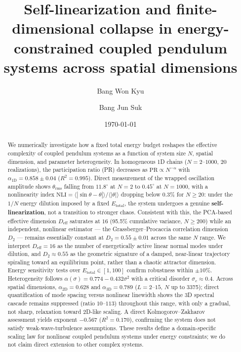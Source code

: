 \documentclass[aps,pre,12pt]{revtex4-2}
\begin{document}
\title{Self-linearization and finite-dimensional collapse in energy-constrained coupled pendulum systems across spatial dimensions}

\author{Bang Won Kyu}

\author{Bang Jun Suk}

\date{\today}

\begin{abstract}
We numerically investigate how a fixed total energy budget reshapes the effective complexity of coupled pendulum systems as a function of system size $N$, spatial dimension, and parameter heterogeneity. In homogeneous 1D chains ($N=2$--$1000$, 20 realizations), the participation ratio (PR) decreases as $\text{PR} \propto N^{-\alpha}$ with $\alpha_{1\text{D}} = 0.858 \pm 0.04$ ($R^2=0.995$). Direct measurement of the wrapped oscillation amplitude shows $\theta_{\text{rms}}$ falling from $11.8^\circ$ at $N=2$ to $0.45^\circ$ at $N=1000$, with a nonlinearity index $\text{NLI} = \langle|\sin\theta-\theta|\rangle/\langle|\theta|\rangle$ dropping below $0.3\%$ for $N \ge 20$: under the $1/N$ energy dilution imposed by a fixed $E_{\text{total}}$, the system undergoes a genuine \textbf{self-linearization}, not a transition to stronger chaos. Consistent with this, the PCA-based effective dimension $D_{\text{eff}}$ saturates at $16$ (95.5\% cumulative variance, $N\ge200$) while an independent, nonlinear estimator --- the Grassberger--Procaccia correlation dimension $D_2$ --- remains essentially constant at $D_2 = 0.55 \pm 0.01$ across the same $N$ range. We interpret $D_{\text{eff}}=16$ as the number of energetically active linear normal modes under dilution, and $D_2 \approx 0.55$ as the geometric signature of a damped, near-linear trajectory spiraling toward an equilibrium point, rather than a chaotic attractor dimension. Energy sensitivity tests over $E_{\text{total}}\in[1,100]$ confirm robustness within $\pm10\%$. Heterogeneity follows $\alpha(\sigma) = 0.774-0.432\sigma^2$ with a critical disorder $\sigma_c\approx0.4$. Across spatial dimensions, $\alpha_{2\text{D}}=0.628$ and $\alpha_{3\text{D}}=0.789$ ($L=2$--$15$, $N$ up to 3375); direct quantification of mode spacing versus nonlinear linewidth shows the 3D spectral cascade remains suppressed (ratio $10$--$113$) throughout this range, with only a gradual, not sharp, relaxation toward 2D-like scaling. A direct Kolmogorov--Zakharov assessment yields exponent $-0.567$ ($R^2=0.170$), confirming the system does not satisfy weak-wave-turbulence assumptions. These results define a domain-specific scaling law for nonlinear coupled pendulum systems under energy constraints; we do not claim direct extension to other complex systems.
\end{abstract}
\end{document}
